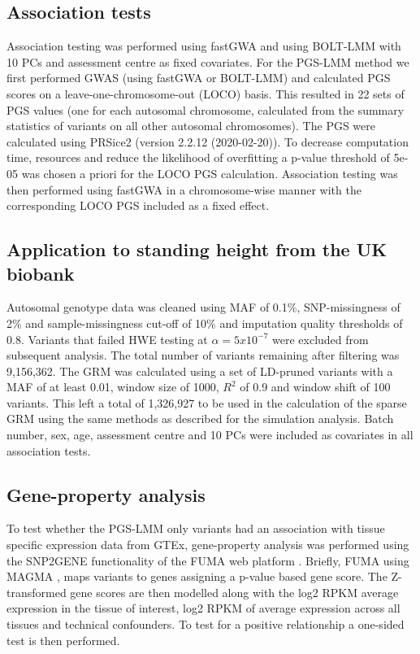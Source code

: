 \documentclass[doublespacing]{bmcart}
\begin{document}
\subsection*{Association tests} 
Association testing was performed using fastGWA and using BOLT-LMM with 10 PCs and assessment centre as fixed covariates. For the PGS-LMM method we first performed GWAS (using fastGWA or BOLT-LMM) and calculated PGS scores on a leave-one-chromosome-out (LOCO) basis. This resulted in 22 sets of PGS values (one for each autosomal chromosome, calculated from the summary statistics of variants on all other autosomal chromosomes). The PGS were calculated using PRSice2 (version 2.2.12 (2020-02-20))\cite{choi2019prsice}. To decrease computation time, resources and reduce the likelihood of overfitting a p-value threshold of 5e-05 was chosen a priori for the LOCO PGS calculation. Association testing was then performed using fastGWA in a chromosome-wise manner with the corresponding LOCO PGS included as a fixed effect.  

\subsection*{Application to standing height from the UK biobank} 
Autosomal genotype data was cleaned using MAF of 0.1\%, SNP-missingness of 2\% and sample-missingness cut-off of 10\% and imputation quality thresholds of 0.8. Variants that failed HWE testing at $\alpha{=5x10^{-7}}$ were excluded from subsequent analysis. The total number of variants remaining after filtering was 9,156,362. The GRM was calculated using a set of LD-pruned variants with a MAF of at least 0.01, window size of 1000, $R^2$ of 0.9 and window shift of 100 variants. This left a total of 1,326,927 to be used in the calculation of the sparse GRM using the same methods as described for the simulation analysis. Batch number, sex, age, assessment centre and 10 PCs were included as covariates in all association tests.

\subsection*{Gene-property analysis}

To test whether the PGS-LMM only variants had an association with tissue specific expression data from  GTEx, gene-property analysis was performed using the SNP2GENE functionality of the FUMA web platform \cite{watanabe2017functional}. Briefly, FUMA using MAGMA \cite{de2015magma}, maps variants to genes assigning a p-value based gene score. The Z-transformed gene scores are then modelled along with the log2 RPKM average expression in the tissue of interest, log2 RPKM of average expression across all tissues and technical confounders. To test for a positive relationship a one-sided test is then performed.  
\end{document}
